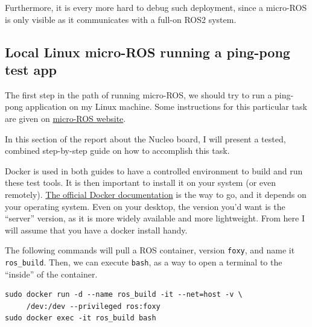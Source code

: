 \documentclass[10pt]{article}
\begin{document}
Furthermore, it is every more hard to debug such deployment, since a micro-ROS is only visible as it communicates with a full-on ROS2 system.

\subsection{Local Linux micro-ROS running a ping-pong test app}
\label{sec:local-linux-micro}
The first step in the path of running micro-ROS, we should try to run a ping-pong application on my Linux machine.
Some instructions for this particular task are given on \href{https://micro.ros.org/docs/tutorials/core/first_application_linux/}{micro-ROS website}.

In this section of the report about the Nucleo board, I will present a tested, combined step-by-step guide on how to accomplish this task.

Docker is used in both guides to have a controlled environment to build and run these test tools.
It is then important to install it on your system (or even remotely). \href{https://docs.docker.com/engine/install/}{The official Docker documentation} is the way to go, and it depends on your operating system. Even on your desktop, the version you'd want is the ``server'' version, as it is more widely available and more lightweight. From here I will assume that you have a docker install handy.


The following commands will pull a ROS container, version \verb|foxy|, and name it \verb|ros_build|.
Then, we can execute \verb|bash|, as a way to open a terminal to the ``inside'' of the container.
\begin{tcolorbox}
\begin{verbatim}
sudo docker run -d --name ros_build -it --net=host -v \
     /dev:/dev --privileged ros:foxy
sudo docker exec -it ros_build bash
\end{verbatim}
\end{tcolorbox}
\end{document}
